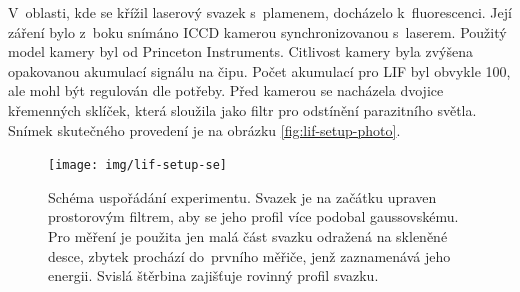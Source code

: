 V~oblasti, kde se křížil laserový svazek s~plamenem, docházelo k~fluorescenci.
Její záření bylo z~boku snímáno ICCD kamerou synchronizovanou s~laserem.
Použitý model kamery byl  od Princeton Instruments.
Citlivost kamery byla zvýšena opakovanou akumulací signálu na čipu.
Počet akumulací pro LIF byl obvykle 100, ale mohl být regulován dle potřeby.
Před kamerou se nacházela dvojice křemenných sklíček,
která sloužila jako filtr pro odstínění parazitního světla.
Snímek skutečného provedení je na obrázku \ref{fig:lif-setup-photo}.

\begin{figure}[htb]
	\centering
	\texttt{[image: img/lif-setup-se]}
	\caption{Schéma uspořádání experimentu.
		Svazek je na začátku upraven prostorovým filtrem,
		aby se jeho profil více podobal gaussovskému.
		Pro měření je použita jen malá část svazku odražená na skleněné desce,
		zbytek prochází do~prvního měřiče, jenž zaznamenává jeho energii.
		Svislá štěrbina zajišťuje rovinný profil svazku.}
	\label{fig:lif-setup}
\end{figure}

